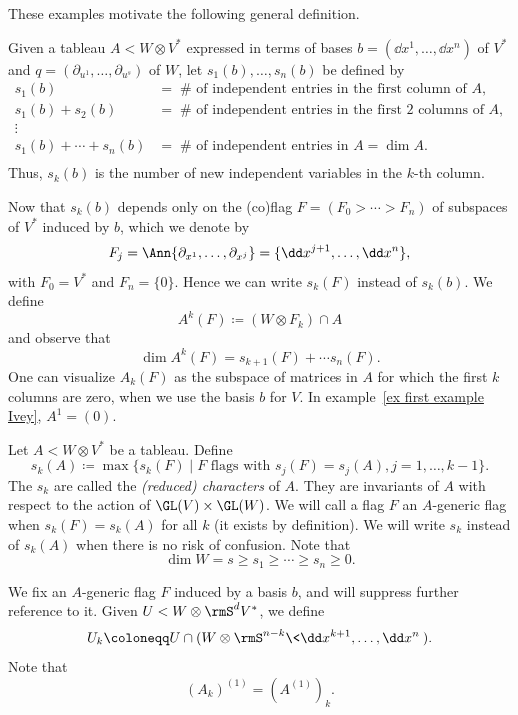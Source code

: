 These examples motivate the following general definition.

\begin{defn}
    Given a tableau $A<W\otimes V^\ast$ expressed in terms of bases $b=(\dd x^1,\ldots,\dd x^n)$ of $V^\ast$ and $q=(\partial_{u^1},\ldots,\partial_{u^s})$ of $W$, let $s_1(b),\ldots,s_n(b)$ be defined by 
    \begin{align}
        s_1(b)&=\; \#\text{ of independent entries in the first column of }A,\\
        s_1(b)+s_2(b)&=\; \#\text{ of independent entries in the first 2 columns of }A,\\
        \vdots &\\
        s_1(b)+\cdots +s_n(b)&=\; \#\text{ of independent entries in }A=\dim A.\\
    \end{align}
    Thus, $s_k(b)$ is the number of new independent variables in the $k$-th column.
\end{defn}

Now that $s_k(b)$ depends only on the (co)flag $F=(F_0>\cdots >F_n)$ of subspaces of $V^\ast$ induced by $b$, which we denote by 
\[F_j=\Ann\{\partial_{x^1},\ldots,\partial_{x^j}\}=\{\dd x^{j+1},\ldots, \dd x^n\},\]
with $F_0=V^\ast$ and $F_n=\{0\}$. Hence we can write $s_k(F)$ instead of $s_k(b)$. We define 
\[A^k(F)\coloneqq (W\otimes F_k)\cap A\]
and observe that 
\[\dim A^k(F)=s_{k+1}(F)+\cdots s_n(F).\label{eq 5.17 Ivey}\]
One can visualize $A_k(F)$ as the subspace of matrices in $A$ for which the first $k$ columns are zero, when we use the basis $b$ for $V$. In example~\ref{ex first example Ivey}, $A^1=(0)$.

\begin{defn}
    Let $A<W\otimes V^\ast$ be a tableau. Define 
    \[s_k(A)\coloneqq \max\{s_k(F)\mid F\text{ flags with }s_j(F)=s_j(A),j=1,\ldots,k-1\}.\]
    The $s_k$ are called the \emph{(reduced) characters} of $A$. They are invariants of $A$ with respect to the action of $\GL(V)\times\GL(W)$. We will call a flag $F$ an $A$-generic flag when $s_k(F)=s_k(A)$ for all $k$ (it exists by definition). We will write $s_k$ instead of $s_k(A)$ when there is no risk of confusion. Note that 
    \[\dim W=s\geq s_1\geq \cdots \geq s_n\geq 0.\]
\end{defn}

We fix an $A$-generic flag $F$ induced by a basis $b$, and will suppress further reference to it. Given $U< W\otimes \rmS^d V^\ast$, we define 
\[U_k\coloneqq U\cap (W\otimes \rmS^{n-k}\<\dd x^{k+1},\ldots,\dd x^n\>).\]
Note that 
\[(A_k)^{(1)}=(A^{(1)})_k.\]

